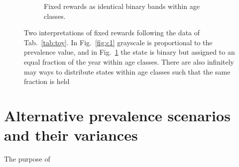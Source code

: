 \documentclass{bmcart}
\begin{document}
\begin{figure}
\begin{subfigure}[b]{0.4\textwidth}
        \caption{Fixed rewards as identical binary bands within age classes.}
        \label{fig:c2}
    \end{subfigure}
    \caption{Two interpretations of fixed rewards following the data of Tab.~\ref{tab:toy}. In Fig.~\ref{fig:c1} grayscale is proportional to the prevalence value, and in Fig.~\ref{fig:c2} the state is binary but assigned to an equal fraction of the year within age classes. There are also infinitely may ways to distribute states within age classes such that the same fraction is held}
    \label{fig:fixedexplain}
\end{figure}

\section{Alternative prevalence scenarios and their variances}
The purpose of 


\end{document}
